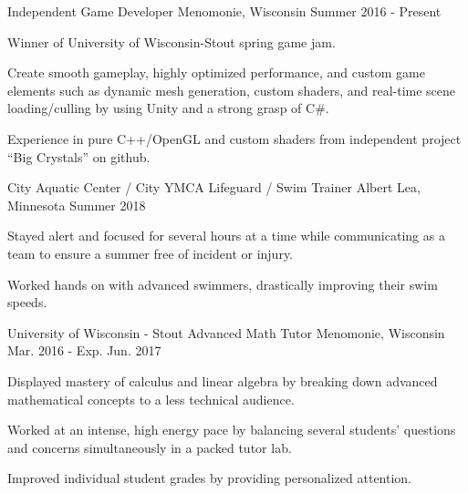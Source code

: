 

\begin{cventries}

  \cventry
    {Independent} %
    {Game Developer} %
    {Menomonie, Wisconsin} %
    {Summer 2016 - Present} %
    {
      \begin{cvitems} %
        \item {Winner of University of Wisconsin-Stout spring game jam.}
        \item {Create smooth gameplay, highly optimized performance, and custom game elements such as dynamic mesh generation, custom shaders, and real-time scene loading/culling by using Unity and a strong grasp of C\#.}
        \item {Experience in pure C++/OpenGL and custom shaders from independent project ``Big Crystals'' on github.}
      \end{cvitems}
    }

  \cventry
    {City Aquatic Center / City YMCA} %
    {Lifeguard / Swim Trainer} %
    {Albert Lea, Minnesota} %
    {Summer 2018} %
    {
      \begin{cvitems} %
        \item {Stayed alert and focused for several hours at a time while communicating as a team to ensure a summer free of incident or injury.}
        \item {Worked hands on with advanced swimmers, drastically improving their swim speeds.}
      \end{cvitems}
    }

  \cventry
    {University of Wisconsin - Stout} %
    {Advanced Math Tutor} %
    {Menomonie, Wisconsin} %
    {Mar. 2016 - Exp. Jun. 2017} %
    {
      \begin{cvitems} %
        \item {Displayed mastery of calculus and linear algebra by breaking down advanced mathematical concepts to a less technical audience.}
        \item {Worked at an intense, high energy pace by balancing several students’ questions and concerns simultaneously in a packed tutor lab.}
        \item {Improved individual student grades by providing personalized attention.}
      \end{cvitems}
    }


\end{cventries}
